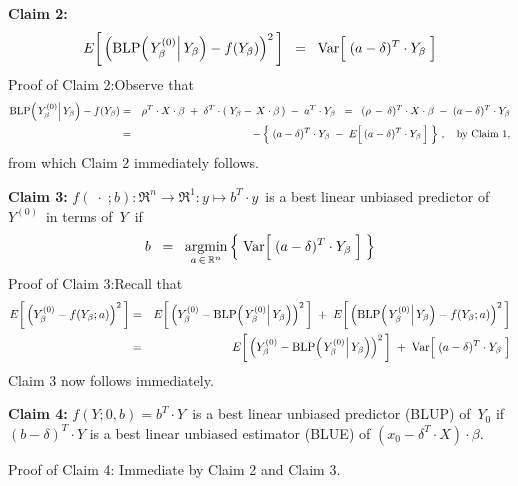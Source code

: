 \begin{enumerate}
	\vskip 0.8cm
	\noindent
	\textbf{Claim 2:}
	\begin{equation*}
	E\!\left[\,\left(\blp\!\left(\left.Y^{(0)}_{\beta}\right\vert Y_{\beta}\right) \overset{{\color{white}.}}{-} f(Y_{\beta})\right)^{2}\,\right]
	\;\; = \;\;
		\Var\!\left[\;(a \overset{{\color{white}.}}{-} \delta)^{T}\cdot Y_{\beta}\;\right]
	\end{equation*}
	Proof of Claim 2:\quad Observe that
	\begin{eqnarray*}
	\blp\!\left(\left.Y^{(0)}_{\beta}\right\vert Y_{\beta}\right) - f(Y_{\beta})
	&=&
		\rho^{T} \cdot X \cdot \beta \; + \; \delta^{T}\cdot(\;Y_{\beta} - \,X\cdot\beta\,) \; - \; a^{T} \cdot Y_{\beta}
	\;\; = \;\;
		(\rho \, - \, \delta)^{T} \cdot X \cdot \beta \; - \; (a - \delta)^{T} \cdot Y_{\beta}
	\\
	&=&
		- \left\{\;
			(a - \delta)^{T} \cdot Y_{\beta} \; - \; E\!\left[\,(a \overset{{\color{white}.}}{-} \delta)^{T} \cdot Y_{\beta}\,\right]
			 \;\right\}\,,
		\quad\textnormal{by Claim 1},
	\end{eqnarray*}
	from which Claim 2 immediately follows.

	\vskip 0.5cm
	\noindent
	\textbf{Claim 3:}\quad
	$f(\;\cdot\;;b) : \Re^{n} \longrightarrow \Re^{1} : y \longmapsto b^{T} \cdot y$\,
	is a best linear unbiased predictor of \,$Y^{(0)}$\, in terms of \,$Y$\, if
	\begin{equation*}
	b \;\; = \;\;
		\underset{a\,\in\,\Re^{n}}{\textnormal{argmin}}
		\left\{\;
			\Var\!\left[\;(a \overset{{\color{white}.}}{-} \delta)^{T}\cdot Y_{\beta}\;\right]
			\;\right\}
	\end{equation*}
	Proof of Claim 3:\quad Recall that
	\begin{eqnarray*}
	E\!\left[\,\left(Y^{(0)}_{\beta} \overset{{\color{white}.}}{-} f(Y_{\beta};a)\right)^{2}\,\right]
	& = &
		E\!\left[\,
			\left(Y^{(0)}_{\beta}
			\overset{{\color{white}.}}{-}
			\blp\!\left(\left.Y^{(0)}_{\beta}\right\vert Y_{\beta}\right)\right)^{2}
			\,\right]
		\; + \;
		E\!\left[\,
			\left(\blp\!\left(\left.Y^{(0)}_{\beta}\right\vert Y_{\beta}\right)
			\overset{{\color{white}.}}{-}
			f(Y_{\beta};a)\right)^{2}
			\,\right]
	\\
	& = &
		E\!\left[\,
			\left(Y^{(0)}_{\beta}
			\overset{{\color{white}.}}{-}
			\blp\!\left(\left.Y^{(0)}_{\beta}\right\vert Y_{\beta}\right)\right)^{2}
			\,\right]
		\; + \;
		\Var\!\left[\;(a \overset{{\color{white}.}}{-} \delta)^{T}\cdot Y_{\beta}\;\right]
	\end{eqnarray*}
	Claim 3 now follows immediately.

	\vskip 0.5cm
	\noindent
	\textbf{Claim 4:}\quad
	$f(Y;0,b) = b^{T}\cdot Y$\, is a best linear unbiased predictor (BLUP) of \,$Y_{0}$ if
	$(b-\delta)^{T} \cdot Y$ is a best linear unbiased estimator (BLUE) of
	$(x_{0} - \delta^{T}\cdot X) \cdot \beta$.

	\vskip 0.2cm
	\noindent
	Proof of Claim 4: \quad Immediate by Claim 2 and Claim 3.
	
\end{enumerate}

